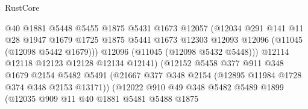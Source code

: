 \begin{lexlean}{RustCore}
\begin{coremodule}
                                    @40
                                    @1881
                                    @5448
                                    @5455
                                    @1875
                                    @5431
                                    @1673
                                    @12057
                                    (@12034
                                      @291
                                      @141
                                      @11
                                      @28
                                      @1947
                                      @1679
                                      @1725
                                      @1875
                                      @5441
                                      @1673
                                      @12303
                                      @12093
                                      @12096
                                      (@11045 (@12098 @5442 @1679)))
                                    @12096
                                    (@11045 (@12098 @5432 @5448)))
                                  @12114
                                  @12118
                                  @12123
                                  @12128
                                  @12134
                                  @12141)
                                (@12152
                                  @5458
                                  @377
                                  @911
                                  @348
                                  @1679
                                  @2154
                                  @5482
                                  @5491
                                  (@21667
                                    @377
                                    @348
                                    @2154
                                    (@12895 @11984 @1728 @374 @348 @2153 @13171))
                                  (@12022
                                    @910
                                    @49
                                    @348
                                    @5482
                                    @5489
                                    @1899
                                    (@12035
                                      @909
                                      @11
                                      @40
                                      @1881
                                      @5481
                                      @5488
                                      @1875

\end{coremodule}
\end{lexlean}
